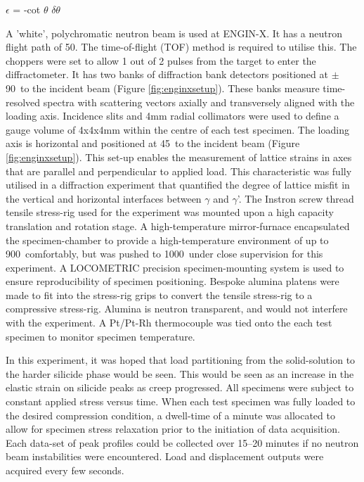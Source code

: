 \hspace{5cm}	$\epsilon$ = -cot $\theta$ $\delta$$\theta$

A 'white', polychromatic neutron beam is used at ENGIN-X.  It has a neutron flight path of 50\metre. The time-of-flight (TOF) method is required to utilise this.  The choppers were set to allow 1 out of 2 pulses from the target to enter the diffractometer.  It has two banks of diffraction bank detectors positioned at $\pm$ 90\degree\ to the incident beam (Figure \ref{fig:enginxsetup}).  These banks measure time-resolved spectra with scattering vectors axially and transversely aligned with the loading axis.  Incidence slits and 4mm radial collimators were used to define a gauge volume of 4x4x4mm within the centre of each test specimen.  The loading axis is horizontal and positioned at 45\degree\ to the incident beam (Figure \ref{fig:enginxsetup}).  This set-up enables the measurement of lattice strains in axes that are parallel and perpendicular to applied load.  This characteristic was fully utilised in a diffraction experiment that quantified the degree of lattice misfit in the vertical and horizontal interfaces between $\gamma$ and $\gamma$'.  The Instron screw thread tensile stress-rig used for the experiment was mounted upon a high capacity translation and rotation stage.  A high-temperature mirror-furnace encapsulated the specimen-chamber to provide a high-temperature environment of up to 900\celsius\ comfortably, but was pushed to 1000\celsius\ under close supervision for this experiment.  A LOCOMETRIC precision specimen-mounting system is used to ensure reproducibility of specimen positioning.  Bespoke alumina platens were made to fit into the stress-rig grips to convert the tensile stress-rig to a compressive stress-rig.  Alumina is neutron transparent, and would not interfere with the experiment.  A Pt/Pt-Rh thermocouple was tied onto the each test specimen to monitor specimen temperature. 

In this experiment, it was hoped that load partitioning from the solid-solution to the harder silicide phase would be seen.  This would be seen as an increase in the elastic strain on silicide peaks as creep progressed.  All specimens were subject to constant applied stress versus time.  When each test specimen was fully loaded to the desired compression condition, a dwell-time of a minute was allocated to allow for specimen stress relaxation prior to the initiation of data acquisition. Each data-set of peak profiles could be collected over 15--20 minutes if no neutron beam instabilities were encountered.  Load and displacement outputs were acquired every few seconds.

